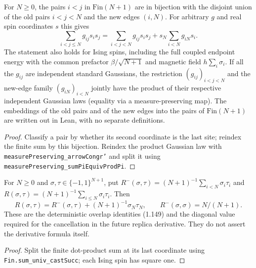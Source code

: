 \begin{lemma}
\label{lem:sg-tal:cavity-disorder-split}
  \leanok
{}
For $N\ge0$, the pairs $i<j$ in $\mathrm{Fin}(N+1)$ are in bijection
with the disjoint union of the old pairs $i<j<N$ and the new edges $(i,N)$.
For arbitrary $g$ and real spin coordinates $s$ this gives
\[
\sum_{i<j\le N}g_{ij}s_i s_j
=\sum_{i<j<N}g_{ij}s_i s_j+s_N\sum_{i<N}g_{iN}s_i.
\]
The statement also holds for Ising spins, including the full coupled endpoint
energy with the common prefactor $\beta/\sqrt{N+1}$ and magnetic field
$h\sum_i\sigma_i$. If all the $g_{ij}$ are independent
standard Gaussians, the restriction $(g_{ij})_{i<j<N}$ and the new-edge family
$(g_{iN})_{i<N}$ jointly have the product of their respective independent
Gaussian laws (equality via a measure-preserving map).
The embeddings of the old pairs and of the new edges into the pairs of $\mathrm{Fin}(N+1)$ are written out in Lean, with no separate definitions.
\end{lemma}
\begin{proof}
  \leanok
Classify a pair by whether its second coordinate is the last site; reindex
the finite sum by this bijection. Reindex the product Gaussian law with
\texttt{measurePreserving\_arrowCongr'} and split it using
\texttt{measurePreserving\_sumPiEquivProdPi}.
\end{proof}

\begin{lemma}
\label{lem:sg-tal:cavity-overlap-split}
  \leanok
{}
For $N\ge0$ and $\sigma,\tau\in\{-1,1\}^{N+1}$, put
$R^-(\sigma,\tau)=(N+1)^{-1}\sum_{i<N}\sigma_i\tau_i$ and
$R(\sigma,\tau)=(N+1)^{-1}\sum_{i\le N}\sigma_i\tau_i$. Then
\[
R(\sigma,\tau)=R^-(\sigma,\tau)
 +(N+1)^{-1}\sigma_N\tau_N,
\qquad R^-(\sigma,\sigma)=N/(N+1).
\]
These are the deterministic overlap identities (1.149) and the diagonal
value required for the cancellation in the future replica derivative.
They do not assert the derivative formula itself.
\end{lemma}
\begin{proof}
  \leanok
Split the finite dot-product sum at its last coordinate using
\texttt{Fin.sum\_univ\_castSucc}; each Ising spin has square one.
\end{proof}

